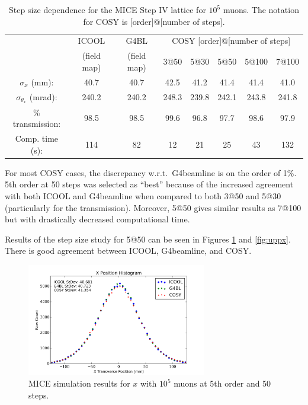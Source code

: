 \begin{table}
\caption[Step size dependence for the MICE Step IV lattice.]{Step size dependence for the MICE Step IV lattice for $10^5$ muons. The notation for COSY is [order]@[number of steps].}
\begin{center}
\begin{tabularx}{\textwidth}{cccccccc}
\hline \hline
& ICOOL & G4BL & \multicolumn{5}{c}{COSY [order]@[number of steps]}\vspace{-12pt}\\
& (field map) & (field map) & 3@50 & 5@30 & 5@50 & 5@100 & 7@100\\
\hline
$\sigma_x$ (mm): & 40.7 & 40.7 & 42.5 & 41.2 & 41.4 & 41.4 & 41.0\\
$\sigma_{\theta_x}$ (mrad): & 240.2 & 240.2 & 248.3 & 239.8 & 242.1 & 243.8 & 241.8\\
\% transmission: & 98.5 & 98.5 & 99.6 & 96.8 & 97.7 & 98.6 & 97.9\\
Comp. time (s): & 114 & 82 & 12 & 21 & 25 & 43 & 132\\
\hline
\end{tabularx}
\end{center}
\label{tbl:mice_step_size_upstream}
\end{table}

For most COSY cases, the discrepancy w.r.t.\ G4beamline is on the order of 1\%. 5th order at 50 steps was selected as ``best'' because of the increased agreement with both ICOOL and G4beamline when compared to both 3@50 and 5@30 (particularly for the transmission). Moreover, 5@50 gives similar results as 7@100 but with drastically decreased computational time. 

Results of the step size study for 5@50 can be seen in Figures \ref{fig:upx} and \ref{fig:uppx}. There is good agreement between ICOOL, G4beamline, and COSY.

\begin{figure}[H]
  \centering
    \includegraphics[width=0.7\textwidth]{MICE data/upstream/x} 
  \caption{MICE simulation results for $x$ with $10^5$ muons at 5th order and 50 steps.}
  \label{fig:upx}
\end{figure}

